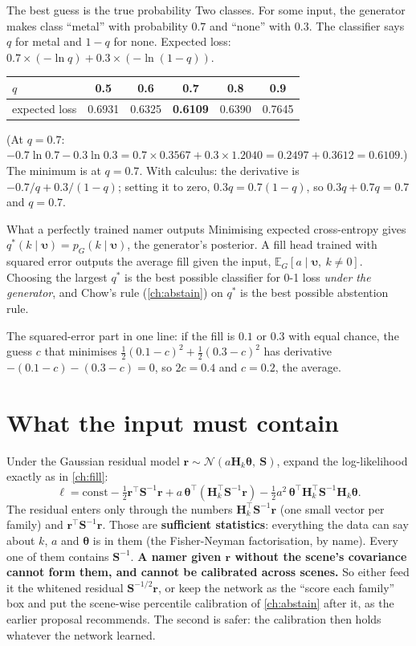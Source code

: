 \documentclass[11pt,a4paper,oneside,openany]{book}
\newcommand{\B}[1]{{\symbf{#1}}}
\newcommand{\B}[1]{{\bm{#1}}}
\newcommand{\T}{^{\top}}
\newcommand{\E}{\mathbb{E}}
\newcommand{\vr}{\B{r}}
\newcommand{\vupsilon}{\B{\upsilon}}
\newcommand{\vtheta}{\B{\theta}}
\newcommand{\mS}{\B{S}}
\newcommand{\mH}{\B{H}}
\begin{document}
\begin{worked}[label=we:ce]{The best guess is the true probability}
Two classes. For some input, the generator makes class ``metal'' with probability $0.7$ and ``none'' with $0.3$. The classifier says $q$ for metal and $1-q$ for none.
Expected loss: $0.7\times(-\ln q)+0.3\times(-\ln(1-q))$.
\begin{center}
\begin{tabular}{@{}lccccc@{}}
\toprule
$q$ & 0.5 & 0.6 & 0.7 & 0.8 & 0.9\\
\midrule
expected loss & 0.6931 & 0.6325 & \textbf{0.6109} & 0.6390 & 0.7645\\
\bottomrule
\end{tabular}
\end{center}
(At $q=0.7$: $-0.7\ln0.7-0.3\ln0.3=0.7\times0.3567+0.3\times1.2040=0.2497+0.3612=0.6109$.) The minimum is at $q=0.7$. With calculus: the derivative is
$-0.7/q+0.3/(1-q)$; setting it to zero, $0.3q=0.7(1-q)$, so $0.3q+0.7q=0.7$ and $q=0.7$.
\end{worked}

\begin{rulebox}[label=rule:bayes]{What a perfectly trained namer outputs}
Minimising expected cross-entropy gives $q^\ast(k\mid\vupsilon)=p_G(k\mid\vupsilon)$, the generator's posterior. A fill head trained with squared error outputs the average fill
given the input, $\E_G[a\mid\vupsilon,\ k\neq0]$. Choosing the largest $q^\ast$ is the best possible classifier for 0-1 loss \emph{under the generator}, and Chow's rule
(\cref{ch:abstain}) on $q^\ast$ is the best possible abstention rule.
\end{rulebox}

The squared-error part in one line: if the fill is $0.1$ or $0.3$ with equal chance, the guess $c$ that minimises $\frac12(0.1-c)^2+\frac12(0.3-c)^2$ has derivative
$-(0.1-c)-(0.3-c)=0$, so $2c=0.4$ and $c=0.2$, the average.

\section{What the input must contain}

Under the Gaussian residual model $\vr\sim\mathcal N(a\mH_k\vtheta,\ \mS)$, expand the log-likelihood exactly as in \cref{ch:fill}:
\[
  \ell=\text{const}-\tfrac12\vr\T\mS^{-1}\vr+a\,\vtheta\T(\mH_k\T\mS^{-1}\vr)-\tfrac12a^2\,\vtheta\T\mH_k\T\mS^{-1}\mH_k\vtheta .
\]
The residual enters only through the numbers $\mH_k\T\mS^{-1}\vr$ (one small vector per family) and $\vr\T\mS^{-1}\vr$. Those are \textbf{sufficient statistics}: everything the
data can say about $k$, $a$ and $\vtheta$ is in them (the Fisher-Neyman factorisation, by name). Every one of them contains $\mS^{-1}$. \textbf{A namer given $\vr$ without the
scene's covariance cannot form them, and cannot be calibrated across scenes.} So either feed it the whitened residual $\mS^{-1/2}\vr$, or keep the network as the ``score each
family'' box and put the scene-wise percentile calibration of \cref{ch:abstain} after it, as the earlier proposal recommends. The second is safer: the calibration then holds
whatever the network learned.
\end{document}
